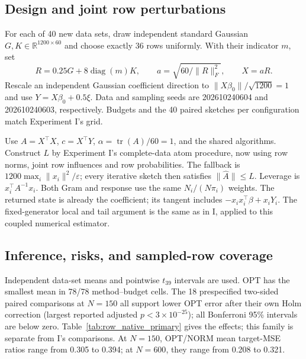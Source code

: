 \documentclass[11pt,a4paper,leqno]{article}
\numberwithin{equation}{section}
\numberwithin{figure}{section}
\numberwithin{table}{section}
\theoremstyle{plain}
\theoremstyle{definition}
\theoremstyle{remark}
\begin{document}
\subsection{Design and joint row perturbations}
For each of 40 new data sets, draw independent standard Gaussian
$G,K\in\mathbb R^{1200\times60}$ and choose exactly 36 rows uniformly.
With their indicator $m$, set
\[
 R=0.25G+8\operatorname{diag}(m)K,\qquad
 a=\sqrt{60/\|R\|_F^2},\qquad X=aR.
\]
Rescale an independent Gaussian coefficient direction to
$\|X\beta_0\|/\sqrt{1200}=1$ and use $Y=X\beta_0+0.5\xi$.
Data and sampling seeds are 202610240604 and 202610240603, respectively. Budgets and the
40 paired sketches per configuration match Experiment I's grid.

Use $A=X^\top X$, $c=X^\top Y$, $\alpha=\operatorname{tr}(A)/60=1$,
and the shared algorithms. Construct $L$ by Experiment I's complete-data
atom procedure, now using row norms, joint row influences and row
probabilities. The fallback is $1200\max_i\|x_i\|^2/\varepsilon$;
every iterative sketch then satisfies $\|\widehat A\|\leq L$.
Leverage is $x_i^\top A^{-1}x_i$. Both Gram and response use the same
$N_i/(N\pi_i)$ weights. The returned state is already the coefficient;
its tangent includes $-x_ix_i^\top\beta+x_iY_i$.
The fixed-generator local and tail argument is the same as in I, applied
to this coupled numerical estimator.

\subsection{Inference, risks, and sampled-row coverage}
Independent data-set means and pointwise $t_{39}$ intervals are used.
OPT has the smallest mean in 78/78 method--budget cells. The 18
prespecified two-sided paired comparisons at $N=150$ all support lower
OPT error after their own Holm correction (largest reported adjusted
$p<3\times10^{-25}$); all Bonferroni 95\% intervals are below zero.
Table~\ref{tab:row_native_primary} gives the effects; this family
is separate from I's comparisons. At $N=150$, OPT/NORM mean target-MSE
ratios range from 0.305 to 0.394; at $N=600$, they range from 0.208 to 0.321.
\end{document}
